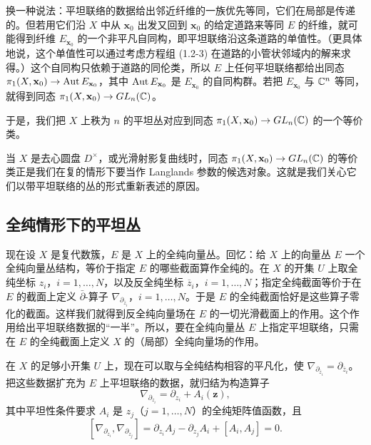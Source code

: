 换一种说法：平坦联络的数据给出邻近纤维的一族优先等同，它们在局部是传递的。但若用它们沿 $X$ 中从 $\mathbf{x}_0$ 出发又回到 $\mathbf{x}_0$ 的给定道路来等同 $E$ 的纤维，就可能得到纤维 $E_{\mathbf{x}_0}$ 的一个非平凡自同构，即平坦联络沿这条道路的单值性。（更具体地说，这个单值性可以通过考虑方程组 (1.2-3) 在道路的小管状邻域内的解来求得。）这个自同构只依赖于道路的同伦类，所以 $E$ 上任何平坦联络都给出同态 $\pi_1(X,\mathbf{x}_0)\to\operatorname{Aut} E_{\mathbf{x}_0}$，其中 $\operatorname{Aut} E_{\mathbf{x}_0}$ 是 $E_{\mathbf{x}_0}$ 的自同构群。若把 $E_{\mathbf{x}_0}$ 与 $\mathbb{C}^n$ 等同，就得到同态 $\pi_1(X,\mathbf{x}_0)\to GL_n(\mathbb{C})$。

于是，我们把 $X$ 上秩为 $n$ 的平坦丛对应到同态 $\pi_1(X,\mathbf{x}_0)\to GL_n(\mathbb{C})$ 的一个等价类。

当 $X$ 是去心圆盘 $D^\times$，或光滑射影复曲线时，同态 $\pi_1(X,\mathbf{x}_0)\to GL_n(\mathbb{C})$ 的等价类正是我们在复的情形下要当作 Langlands 参数的候选对象。这就是我们关心它们以带平坦联络的丛的形式重新表述的原因。

\subsection{全纯情形下的平坦丛}

现在设 $X$ 是复代数簇，$E$ 是 $X$ 上的全纯向量丛。回忆：给 $X$ 上的向量丛 $E$ 一个全纯向量丛结构，等价于指定 $E$ 的哪些截面算作全纯的。在 $X$ 的开集 $U$ 上取全纯坐标 $z_i$，$i=1,\dots,N$，以及反全纯坐标 $\overline{z}_i$，$i=1,\dots,N$；指定全纯截面等价于在 $E$ 的截面上定义 $\bar\partial$-算子 $\nabla_{\partial_{\overline{z}_i}}$，$i=1,\dots,N$。于是 $E$ 的全纯截面恰好是这些算子零化的截面。这样我们就得到反全纯向量场在 $E$ 的一切光滑截面上的作用。这个作用给出平坦联络数据的“一半”。所以，要在全纯向量丛 $E$ 上指定平坦联络，只需在 $E$ 的全纯截面上定义 $X$ 的（局部）全纯向量场的作用。

在 $X$ 的足够小开集 $U$ 上，现在可以取与全纯结构相容的平凡化，使 $\nabla_{\partial_{\overline{z}_i}}=\partial_{\overline{z}_i}$。把这些数据扩充为 $E$ 上平坦联络的数据，就归结为构造算子
\[
    \nabla_{\partial_{z_i}}=\partial_{z_i}+A_i(\mathbf{z}),
\]
其中平坦性条件要求 $A_i$ 是 $z_j$（$j=1,\dots,N$）的全纯矩阵值函数，且
\[
    [\nabla_{\partial_{z_i}},\nabla_{\partial_{z_j}}]
    =\partial_{z_i}A_j-\partial_{z_j}A_i+[A_i,A_j]=0.
\]

